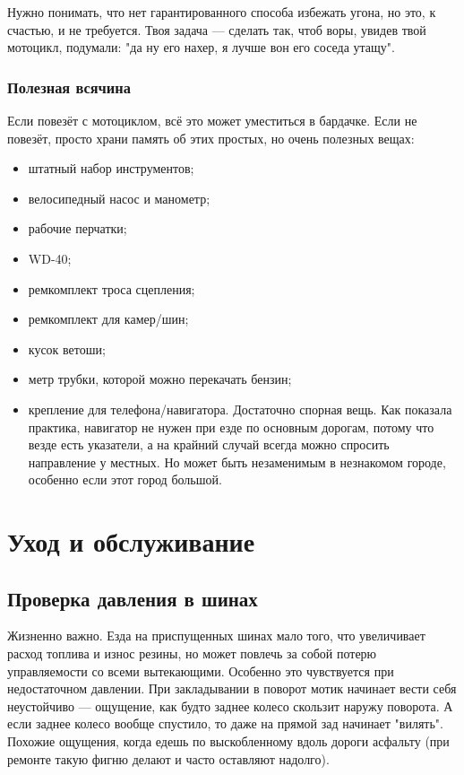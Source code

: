\documentclass[12pt,a4paper]{article}
\begin{document}
Нужно понимать, что нет гарантированного способа избежать угона, но это,
к счастью, и не требуется. Твоя задача --- сделать так, чтоб воры, увидев
твой мотоцикл, подумали: "да ну его нахер, я лучше вон его соседа утащу".

\subsubsection{Полезная всячина}

Если повезёт с мотоциклом, всё это может уместиться в бардачке. Если не
повезёт, просто храни память об этих простых, но очень полезных вещах:

\begin{itemize}
\item штатный набор инструментов;
\item велосипедный насос и манометр;
\item рабочие перчатки;
\item WD-40;
\item ремкомплект троса сцепления;
\item ремкомплект для камер/шин;
\item кусок ветоши;
\item метр трубки, которой можно перекачать бензин;
\item крепление для телефона/навигатора. Достаточно спорная вещь. Как
показала практика, навигатор не нужен при езде по основным дорогам, потому
что везде есть указатели, а на крайний случай всегда можно спросить
направление у местных. Но может быть незаменимым в незнакомом городе,
особенно если этот город большой.
\end{itemize}

\section{Уход и обслуживание}

\subsection{Проверка давления в шинах}

Жизненно важно. Езда на приспущенных шинах мало того, что увеличивает
расход топлива и износ резины, но может повлечь за собой потерю управляемости
со всеми вытекающими. Особенно это чувствуется при недостаточном давлении.
При закладывании в поворот мотик начинает вести себя неустойчиво --- ощущение,
как будто заднее колесо скользит наружу поворота. А если заднее колесо вообще
спустило, то даже на прямой зад начинает "вилять". Похожие ощущения, когда
едешь по выскобленному вдоль дороги асфальту (при ремонте такую фигню делают
и часто оставляют надолго).
\end{document}
